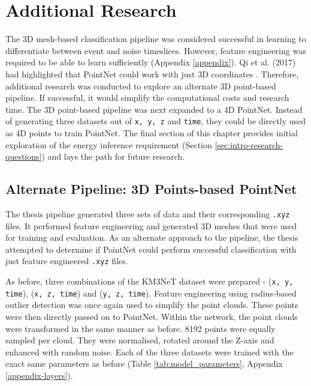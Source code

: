 \chapter{Additional Research}
\label{sec:additional}

\ifpdf
    \graphicspath{{8_additional/figures/PNG/}{8_additional/figures/PDF/}{8_additional/figures/}}
\else
    \graphicspath{{8_additional/figures/EPS/}{8_additional/figures/}}
\fi

The 3D mesh-based classification pipeline was considered successful in learning to differentiate between event and noise timeslices. However, feature engineering was required to be able to learn sufficiently (Appendix \ref{appendix}). Qi et al. (2017) had highlighted that PointNet could work with just 3D coordinates \cite{qi2017pointnet}. Therefore, additional research was conducted to explore an alternate 3D point-based pipeline. If successful, it would simplify the computational costs and research time. The 3D point-based pipeline was next expanded to a 4D PointNet. Instead of generating three datasets out of  \texttt{x, y, z} and \texttt{time}, they could be directly used as 4D points to train PointNet. The final section of this chapter provides initial exploration of the energy inference requirement (Section \ref{sec:intro-research-questions}) and lays the path for future research. 

\section{Alternate Pipeline: 3D Points-based PointNet}
\label{sec:additional-3d}
The thesis pipeline generated three sets of data and their corresponding \texttt{.xyz} files. It performed feature engineering and generated 3D meshes that were used for training and evaluation. As an alternate approach to the pipeline, the thesis attempted to determine if PointNet could perform successful classification with just feature engineered \texttt{.xyz} files. 

As before, three combinations of the KM3NeT dataset were prepared - (\texttt{x, y, time}), (\texttt{x, z, time}) and (\texttt{y, z, time}). Feature engineering using radius-based outlier detection was once again used to simplify the point clouds. These points were then directly passed on to PointNet. Within the network, the point clouds were transformed in the same manner as before. 8192 points were equally sampled per cloud. They were normalised, rotated around the Z-axis and enhanced with random noise. Each of the three datasets were trained with the exact same parameters as before (Table \ref{tab:model_parameters}, Appendix \ref{appendix-layers}).

